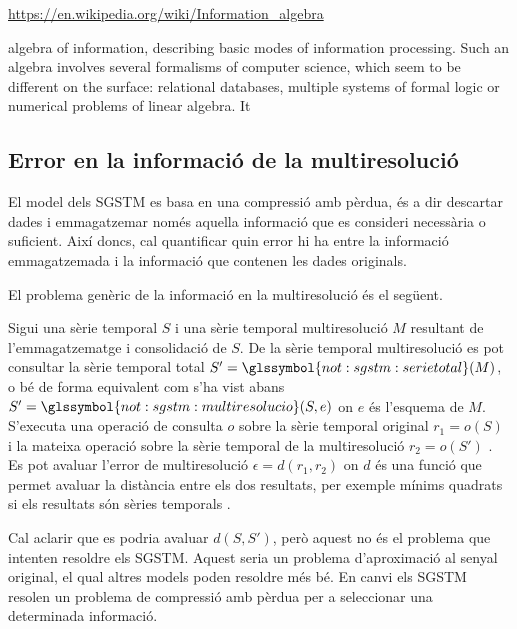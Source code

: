 \url{https://en.wikipedia.org/wiki/Information_algebra}

algebra of information, describing basic modes of information processing. Such an algebra involves several formalisms of computer science, which seem to be different on the surface: relational databases, multiple systems of formal logic or numerical problems of linear algebra. It 






\subsection{Error en la informació de la multiresolució}

El model dels \gls{SGSTM} es basa en una compressió amb pèrdua, és a
dir descartar dades i emmagatzemar només aquella informació que es
consideri necessària o suficient. Així doncs, cal quantificar quin
error hi ha entre la informació emmagatzemada i la informació que
contenen les dades originals.


El problema genèric de la informació en la multiresolució és el següent.
\begin{definition}
Sigui una sèrie temporal $S$ i una sèrie temporal multiresolució $M$
resultant de l'emmagatzematge i consolidació de $S$. De la sèrie
temporal multiresolució es pot consultar la sèrie temporal total
$S'=\glssymbol{not:sgstm:serietotal}(M)$, o bé de forma equivalent com
s'ha vist abans $S'=\glssymbol{not:sgstm:multiresolucio}(S,e)$ on $e$
és l'esquema de $M$.  S'executa una operació de consulta $o$ sobre la
sèrie temporal original $r_1=o(S)$ i la mateixa operació sobre la
sèrie temporal de la multiresolució $r_2=o(S')$ . Es pot avaluar l'error
de multiresolució $\epsilon=d(r_1,r_2)$ on $d$ és una funció que permet avaluar
la distància entre els dos resultats, per exemple mínims quadrats si
els resultats són sèries temporals .
\end{definition}


Cal aclarir que es podria avaluar $d(S,S')$, però aquest no és el
problema que intenten resoldre els \gls{SGSTM}. Aquest seria un
problema d'aproximació al senyal original, el qual altres models poden
resoldre més bé. En canvi els \gls{SGSTM} resolen un
problema de compressió amb pèrdua per a seleccionar una determinada
informació.




